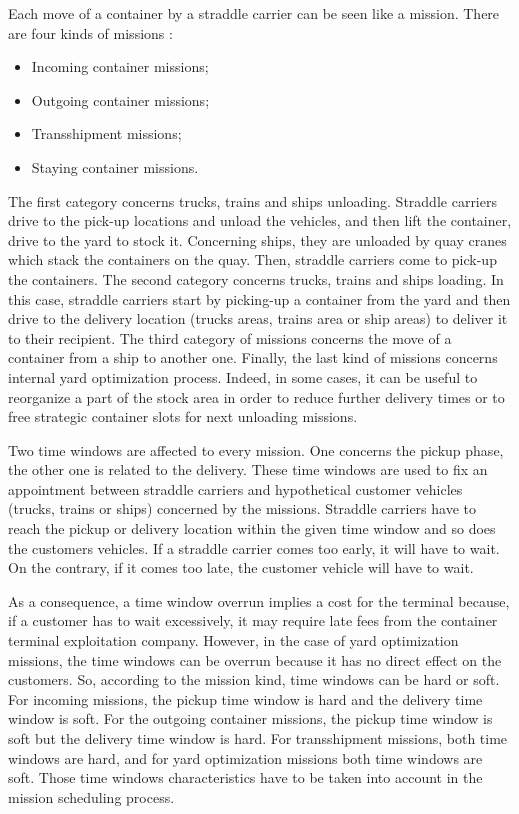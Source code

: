 \documentclass[a4paper,10pt]{article}
\begin{document}
Each move of a container by a straddle carrier can be seen like a mission. There are four kinds of missions :
\begin{itemize}
	\item Incoming container missions;
	\item Outgoing container missions;
	\item Transshipment missions;
	\item Staying container missions.
\end{itemize}

The first category concerns trucks, trains and ships unloading. Straddle carriers drive to the pick-up locations and unload the vehicles, and then lift the container, drive to the yard to stock it. Concerning ships, they are unloaded by quay cranes which stack the containers on the quay. Then, straddle carriers come to pick-up the containers.
The second category concerns trucks, trains and ships loading. In this case, straddle carriers start by picking-up a container from the yard and then drive to the delivery location (trucks areas, trains area or ship areas) to deliver it to their recipient. 
The third category of missions concerns the move of a container from a ship to another one.
Finally, the last kind of missions concerns internal yard optimization process. Indeed, in some cases, it can be useful to reorganize a part of the stock area in order to reduce further delivery times or to free strategic container slots for next unloading missions.

Two time windows are affected to every mission. One concerns the pickup phase, the other one is related to the delivery. These time windows are used to fix an appointment between straddle carriers and hypothetical customer vehicles (trucks, trains or ships) concerned by the missions. Straddle carriers have to reach the pickup or delivery location within the given time window and so does the customers vehicles. If a straddle carrier comes too early, it will have to wait. On the contrary, if it comes too late, the customer vehicle will have to wait.

As a consequence, a time window overrun implies a cost for the terminal because, if a customer has to wait excessively, it may require late fees from the container terminal exploitation company. However, in the case of yard optimization missions, the time windows can be overrun because it has no direct effect on the customers. So, according to the mission kind, time windows can be hard or soft. For incoming missions, the pickup time window is hard and the delivery time window is soft. For the outgoing container missions, the pickup time window is soft but the delivery time window is hard. For transshipment missions, both time windows are hard, and for yard optimization missions both time windows are soft. Those time windows characteristics have to be taken into account in the mission scheduling process\cite{Lesauvage2009}.
\end{document}
